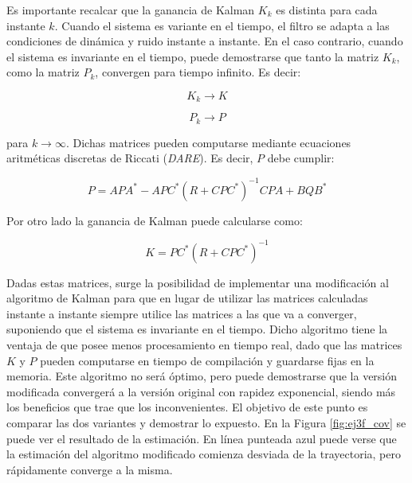 
	Es importante recalcar que la ganancia de Kalman $K_k$ es distinta para cada instante $k$. Cuando el sistema es variante en el tiempo, el filtro se adapta a las condiciones de dinámica y ruido instante a instante. En el caso contrario, cuando el sistema es invariante en el tiempo, puede demostrarse que tanto la matriz $K_k$, como la matriz $P_k$, convergen para tiempo infinito. Es decir:


	\begin{equation*}
		K_k \longrightarrow K
	\end{equation*}
	
	\begin{equation*}
		P_k \longrightarrow P
	\end{equation*}
	
	para $k \rightarrow \infty$. Dichas matrices pueden computarse mediante ecuaciones aritméticas discretas de Riccati (\emph{DARE}). Es decir, $P$ debe cumplir:
	
	\begin{equation*}
		P = A P A^{*} - A P C^{*} (R + C P C^{*})^{-1} C P A + B Q B^{*}
	\end{equation*}
	
	Por otro lado la ganancia de Kalman puede calcularse como:
	
	\begin{equation*}
		K = P C^{*} (R + C P C^{*})^{-1}
	\end{equation*}
	
	Dadas estas matrices, surge la posibilidad de implementar una modificación al algoritmo de Kalman para que en lugar de utilizar las matrices calculadas instante a instante siempre utilice las matrices a las que va a converger, suponiendo que el sistema es invariante en el tiempo. Dicho algoritmo tiene la ventaja de que posee menos procesamiento en tiempo real, dado que las matrices $K$ y $P$ pueden computarse en tiempo de compilación y guardarse fijas en la memoria. Este algoritmo no será óptimo, pero puede demostrarse que la versión modificada convergerá a la versión original con rapidez exponencial, siendo más los beneficios que trae que los inconvenientes. El objetivo de este punto es comparar las dos variantes y demostrar lo expuesto. En la Figura \ref{fig:ej3f_cov} se puede ver el resultado de la estimación. En línea punteada azul puede verse que la estimación del algoritmo modificado comienza desviada de la trayectoria, pero rápidamente converge a la misma. 

